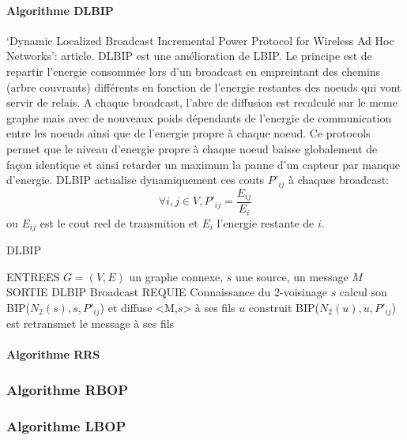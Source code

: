 \paragraph{Algorithme DLBIP}
`Dynamic Localized Broadcast Incremental Power Protocol for Wireless Ad Hoc Networks': article\cite{Champ2009DLBIP}.
DLBIP est une amélioration de LBIP. Le principe est de repartir l'energie consommée lors d'un broadcast en empreintant des chemins (arbre couvrants) différents en fonction de l'energie restantes des noeuds qui vont servir de relais.
A chaque broadcast, l'abre de diffusion est recalculé sur le meme graphe mais avec de nouveaux poids dépendants de l'energie de communication entre les noeuds ainsi que de l'energie propre à chaque noeud. Ce protocols permet que
le niveau d'energie propre à chaque noeud baisse globalement de façon identique et ainsi retarder un maximum la panne d'un capteur par manque d'energie.
DLBIP actualise dynamiquement ces couts $P'_{ij}$ à chaques broadcast:
$$ \forall i,j \in V, P'_{ij}=\frac{E_{ij}}{E_i}$$
ou $E_{ij}$ est le cout reel de transmition et $E_i$ l'energie restante de $i$.


\begin{algorithm}[h]
\caption{DLBIP}
\label{algo_DLBIP}
\begin{algorithmic}
\STATE ENTREES  $G=(V,E)$ un graphe connexe, $s$ une source, un message $M$
\STATE SORTIE  DLBIP Broadcast
\STATE REQUIE  Connaissance du 2-voisinage
\STATE $s$ calcul son BIP($N_2(s),s,P'_{ij}$) et diffuse <M,$s$> à ses fils
		\STATE $u$ construit BIP($N_2(u),u,P'_{ij}$) est retransmet le message à ses fils
	\ENDIF
\ENDIF
\end{algorithmic}
\end{algorithm}



\paragraph{Algorithme RRS}
\cite{Cartigny2003RNG}





\subsubsection{Algorithme RBOP}
\cite{Cartigny2005}



\subsubsection{Algorithme LBOP}
\cite{Cartigny2005}
